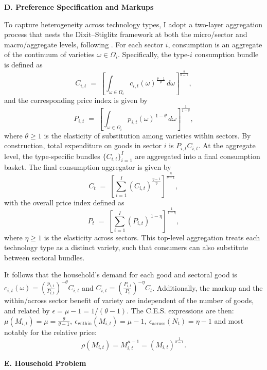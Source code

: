 \documentclass[a4paper,12pt]{article} %
\numberwithin{equation}{section} %
\numberwithin{figure}{section}
\numberwithin{table}{section}
\begin{document}
\medskip
\medskip
\noindent\textbf{D. Preference Specification and Markups}
\medskip

To capture heterogeneity across technology types, I adopt a two-layer aggregation process that nests the Dixit--Stiglitz framework at both 
the micro/sector and macro/aggregate levels, following \textcite{carvalho2021sectoral}. For each sector $i$, consumption is an aggregate of the
continuum of varieties \(\omega \in \Omega_i\). Specifically, the type-\(i\) consumption bundle is defined as
\[
C_{i,t} \;=\; \left[ \int_{\omega \in \Omega_i} c_{i,t}(\omega)^{\frac{\theta-1}{\theta}}\,d\omega \right]^{\frac{\theta}{\theta-1}},
\]
and the corresponding price index is given by
\[
P_{i,t} \;=\; \left[ \int_{\omega \in \Omega_i} p_{i,t}(\omega)^{\,1-\theta}\,d\omega \right]^{\frac{1}{1-\theta}},
\]
where \(\theta \ge 1\) is the elasticity of substitution among varieties within sectors. By construction, total expenditure on goods in 
sector \(i\) is \(P_{i,t}C_{i,t}\). At the aggregate level, the type-specific bundles \(\{C_{i,t}\}_{i=1}^I\) are 
aggregated into a final consumption basket. The final consumption aggregator is given by
\[
C_t \;=\; \left[ \sum_{i=1}^I \left( C_{i,t} \right)^{\frac{\eta-1}{\eta}} \right]^{\frac{\eta}{\eta-1}},
\]
with the overall price index defined as
\[
P_t \;=\; \left[ \sum_{i=1}^I \left( P_{i,t} \right)^{\,1-\eta} \right]^{\frac{1}{1-\eta}},
\]
where $\eta \ge 1$ is the elasticity across sectors. This top-level aggregation treats each technology type as a distinct variety, 
such that consumers can also substitute between sectoral bundles.

It follows that the household's demand for each good and sectoral good is 
$c_{i,t}(\omega) = \left(\frac{p_{i,t}}{P_{i,t}}\right)^{-\theta}C_{i,t}$ and 
$C_{i,t} = \left(\frac{P_{i,t}}{P_t}\right)^{-\eta}C_t$. Additionally, the markup and the within/across sector benefit of variety are 
independent of the number of goods, and related by $\epsilon = \mu -1 = 1/ (\theta-1)$. The C.E.S. expressions are then: 
$\mu(M_{i,t}) = \mu = \frac{\theta}{\theta - 1}, 
\   \epsilon_{\text{within}}(M_{i,t}) = \mu - 1 , \ \epsilon_{\text{across}}(N_{t}) = \eta - 1$ and most notably for the relative price:
\begin{equation}
  \rho(M_{i,t}) = M_{i,t}^{\mu - 1} = \left(M_{i,t}\right)^{\frac{1}{\theta - 1}}. \label{eq:lovevariety}
\end{equation}

\medskip
\medskip
\noindent\textbf{E. Household Problem}
\medskip
\end{document}
